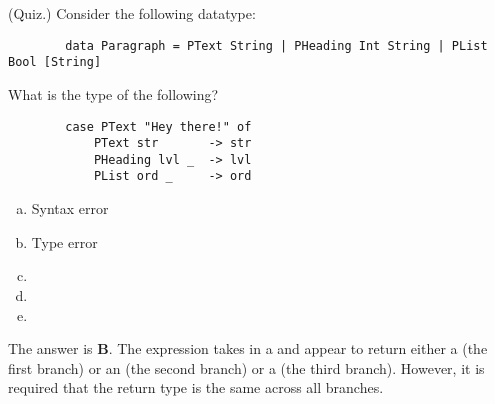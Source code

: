 \documentclass[letterpaper]{article}
\begin{document}
\begin{mdframed}[]
    (Quiz.) Consider the following datatype:
    \begin{verbatim}
        data Paragraph = PText String | PHeading Int String | PList Bool [String]\end{verbatim}
    What is the type of the following? 
    \begin{verbatim}
        case PText "Hey there!" of 
            PText str       -> str 
            PHeading lvl _  -> lvl 
            PList ord _     -> ord \end{verbatim}

    \begin{enumerate}[(a)]
        \item Syntax error
        \item Type error 
        \item {}
        \item {}
        \item {}
    \end{enumerate}

    \begin{mdframed}[]
        The answer is \textbf{B}. The  expression takes in a  and appear to return either a  (the first branch) or an  (the second branch) or a  (the third branch). However, it is required that the return type is the same across all branches. 
    \end{mdframed}    
\end{mdframed}
\end{document}
